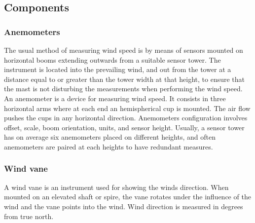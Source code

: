 \documentclass[journal]{IEEEtran}
\begin{document}
\subsection{Components}
\subsubsection{Anemometers}
The usual method of measuring wind speed is by means of sensors mounted on horizontal booms extending outwards from a suitable sensor tower. The instrument is located into the prevailing wind, and out from the tower at a distance equal to or greater than the tower width at that height, to ensure that the mast is not disturbing the measurements when performing the wind speed. 
An anemometer is a device for measuring wind speed. It consists in three horizontal arms where at each end an hemispherical cup is mounted. The air flow pushes the cups in any horizontal direction. Anemometers configuration involves offset, scale, boom orientation, units, and sensor height. Usually, a sensor tower has on average six anemometers placed on different heights, and often anemometers are paired at each heights to have redundant measures.\cite{hansen1999influence}\cite{gill1967accuracy}\cite{kondo1971response}
\subsubsection{Wind vane}
A wind vane is an instrument used for showing the winds direction. When mounted on an elevated shaft or spire, the vane rotates under the influence of the wind and the vane points into the wind. Wind direction is measured in degrees from true north.\cite{sayigh2012comprehensive}
\end{document}
